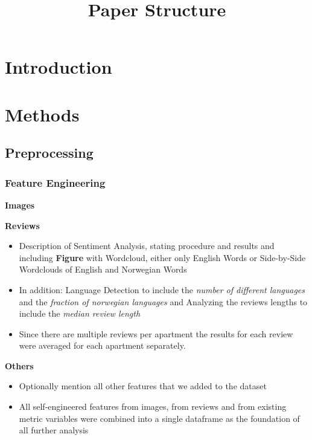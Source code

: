 \documentclass[12pt, letterpaper]{article}
\title{Paper Structure}
\author{}
\date{}
\begin{document}
\maketitle
\tableofcontents
\setcounter{tocdepth}{3}

\section{Introduction} %


\section{Methods} %


\subsection{Preprocessing} %

\subsubsection{Feature Engineering} %

\textbf{Images} %

\textbf{Reviews} %
\begin{itemize}
    \item Description of Sentiment Analysis, stating procedure and results and including \textbf{Figure} with Wordcloud, either only English Words or Side-by-Side Wordclouds of English and Norwegian Words
    \item In addition: Language Detection to include the \emph{number of different languages} and the \emph{fraction of norwegian languages} and Analyzing the reviews lengths to include the \emph{median review length}
    \item Since there are multiple reviews per apartment the results for each review were averaged for each apartment separately.
\end{itemize}

\textbf{Others} %
\begin{itemize}
    \item Optionally mention all other features that we added to the dataset
    \item All self-engineered features from images, from reviews and from existing metric variables were combined into a single dataframe as the foundation of all further analysis
\end{itemize}
\end{document}
